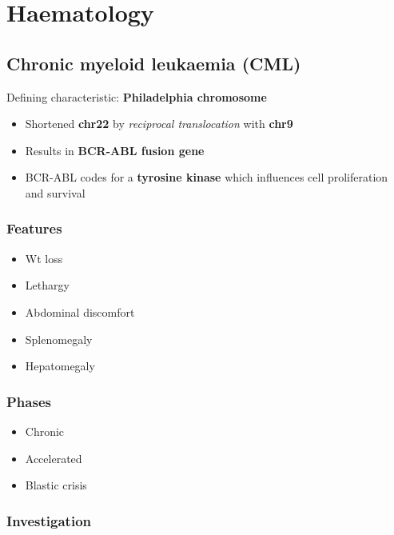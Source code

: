 \documentclass[
  12pt,
]{memoir}
\providecommand{\tightlist}{%
  \setlength{\itemsep}{0pt}\setlength{\parskip}{0pt}}
\begin{document}
\hypertarget{haematology}{%
\chapter{Haematology}\label{haematology}}

\hypertarget{chronic-myeloid-leukaemia-cml}{%
\section{Chronic myeloid leukaemia
(CML)}\label{chronic-myeloid-leukaemia-cml}}

Defining characteristic: \textbf{Philadelphia chromosome}

\begin{itemize}
\tightlist
\item
  Shortened \textbf{chr22} by \emph{reciprocal translocation} with
  \textbf{chr9}
\item
  Results in \textbf{BCR-ABL fusion gene}
\item
  BCR-ABL codes for a \textbf{tyrosine kinase} which influences cell
  proliferation and survival
\end{itemize}

\hypertarget{features-34}{%
\subsection{Features}\label{features-34}}

\begin{itemize}
\tightlist
\item
  Wt loss
\item
  Lethargy
\item
  Abdominal discomfort
\item
  Splenomegaly
\item
  Hepatomegaly
\end{itemize}

\hypertarget{phases}{%
\subsection{Phases}\label{phases}}

\begin{itemize}
\tightlist
\item
  Chronic
\item
  Accelerated
\item
  Blastic crisis
\end{itemize}

\hypertarget{investigation-31}{%
\subsection{Investigation}\label{investigation-31}}
\end{document}
